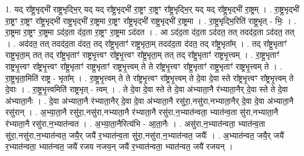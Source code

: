 \documentclass[17pt]{extarticle}
\begin{document}
1. यद् रा᳚ष्ट्र॒भृद्भी॑ राष्ट्र॒भृद्भि॒र् यद् यद् रा᳚ष्ट्र॒भृद्भी॑ रा॒ष्ट्रꣳ रा॒ष्ट्रꣳ रा᳚ष्ट्र॒भृद्भि॒र् 
यद् यद् रा᳚ष्ट्र॒भृद्भी॑ रा॒ष्ट्रम् । . रा॒ष्ट्र॒भृद्भी॑ रा॒ष्ट्रꣳ रा॒ष्ट्रꣳ रा᳚ष्ट्र॒भृद्भी॑ राष्ट्र॒भृद्भी॑ रा॒ष्ट्रमा रा॒ष्ट्रꣳ 
रा᳚ष्ट्र॒भृद्भी॑ राष्ट्र॒भृद्भी॑ रा॒ष्ट्रमा । . रा॒ष्ट्र॒भृद्भि॒रिति॑ राष्ट्र॒भृत् - भिः॒ । . रा॒ष्ट्रमा रा॒ष्ट्रꣳ रा॒ष्ट्रमा ऽद॑द॒ता द॑द॒ता रा॒ष्ट्रꣳ रा॒ष्ट्रमा ऽद॑दत । . आ ऽद॑द॒ता द॑द॒ता ऽद॑दत॒ तत् तदद॑द॒ता ऽद॑दत॒ तत् । . अद॑दत॒ तत् तदद॑द॒ता द॑दत॒ तद् रा᳚ष्ट्र॒भृताꣳ॑ राष्ट्र॒भृता॒म् तदद॑द॒ता द॑दत॒ तद् 
रा᳚ष्ट्र॒भृता᳚म् । . तद् रा᳚ष्ट्र॒भृताꣳ॑ राष्ट्र॒भृता॒म् तत् तद् रा᳚ष्ट्र॒भृताꣳ॑ राष्ट्रभृ॒त्त्वꣳ रा᳚ष्ट्रभृ॒त्त्वꣳ रा᳚ष्ट्र॒भृता॒म् तत् तद् रा᳚ष्ट्र॒भृताꣳ॑ राष्ट्रभृ॒त्त्वम् । . रा॒ष्ट्र॒भृताꣳ॑ राष्ट्रभृ॒त्त्वꣳ रा᳚ष्ट्रभृ॒त्त्वꣳ रा᳚ष्ट्र॒भृताꣳ॑ राष्ट्र॒भृताꣳ॑ राष्ट्रभृ॒त्त्वम् ते ते रा᳚ष्ट्रभृ॒त्त्वꣳ रा᳚ष्ट्र॒भृताꣳ॑ राष्ट्र॒भृताꣳ॑ राष्ट्रभृ॒त्त्वम् ते । . रा॒ष्ट्र॒भृता॒मिति॑ राष्ट्र - भृता᳚म् । . रा॒ष्ट्र॒भृ॒त्त्वम् ते ते रा᳚ष्ट्रभृ॒त्त्वꣳ रा᳚ष्ट्रभृ॒त्त्वम् ते दे॒वा दे॒वा स्ते रा᳚ष्ट्रभृ॒त्त्वꣳ 
रा᳚ष्ट्रभृ॒त्त्वम् ते दे॒वाः । . रा॒ष्ट्र॒भृ॒त्त्वमिति॑ राष्ट्रभृत् - त्वम् । . ते दे॒वा दे॒वा स्ते ते दे॒वा अ॑भ्याता॒नै र॑भ्याता॒नैर् दे॒वा स्ते ते दे॒वा अ॑भ्याता॒नैः । . दे॒वा अ॑भ्याता॒नै र॑भ्याता॒नैर् दे॒वा दे॒वा अ॑भ्याता॒नै रसु॑रा॒,नसु॑रा,नभ्याता॒नैर् दे॒वा दे॒वा अ॑भ्याता॒नै रसु॑रान् । . अ॒भ्या॒ता॒नै रसु॑रा॒,नसु॑रा,नभ्याता॒नै र॑भ्याता॒नै रसु॑रा,न॒भ्यात॑न्वता॒ भ्यात॑न्व॒ता सु॑रा,नभ्याता॒नै र॑भ्याता॒नै रसु॑रा,न॒भ्यात॑न्वत । . अ॒भ्या॒ता॒नैरित्य॑भि - आ॒ता॒नैः । . असु॑रा,न॒भ्यात॑न्वता॒ भ्यात॑न्व॒ता सु॑रा॒,नसु॑रा,न॒भ्यात॑न्वत॒ जयै॒र् जयै॑ र॒भ्यात॑न्व॒ता सु॑रा॒,नसु॑रा,न॒भ्यात॑न्वत॒ जयैः᳚ । . अ॒भ्यात॑न्वत॒ जयै॒र् जयै॑ र॒भ्यात॑न्वता॒ भ्यात॑न्वत॒ जयै॑ रजय नजय॒न् जयै॑ र॒भ्यात॑न्वता॒ भ्यात॑न्वत॒ जयै॑ रजयन् । \newline
\end{document}
